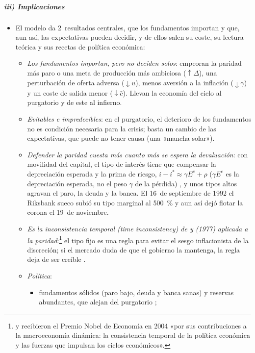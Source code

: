 \documentclass[11pt]{article}
\begin{document}
\subparagraph{iii) Implicaciones}

\begin{itemize}
\item El modelo da 2~resultados centrales, que los fundamentos importan y que, aun así, las expectativas pueden decidir, y de ellos salen su coste, su lectura teórica y sus recetas de política económica:
  \begin{itemize}
  \item \emph{Los fundamentos importan, pero no deciden solos}: empeoran la paridad más paro o una meta de producción más ambiciosa ($\uparrow\Delta$), una perturbación de oferta adversa ($\downarrow u$), menos aversión a la inflación ($\downarrow\gamma$) y un coste de salida menor ($\downarrow\bar c$). Llevan la economía del cielo al purgatorio y de este al infierno.
  \item \emph{Evitables e impredecibles}: en el purgatorio, el deterioro de los fundamentos no es condición necesaria para la crisis; basta un cambio de las expectativas, que puede no tener causa (una «mancha solar»).
  \item \emph{Defender la paridad cuesta más cuanto más se espera la devaluación}: con movilidad del capital, el tipo de interés tiene que compensar la depreciación esperada y la prima de riesgo, $i-i^{*}\approx\gamma E^e+\rho$ ($\gamma E^e$ es la depreciación esperada, no el peso $\gamma$ de la pérdida) , y unos tipos altos agravan el paro, la deuda y la banca. El 16~de septiembre de 1992 el Riksbank sueco subió su tipo marginal al 500~\% y aun así dejó flotar la corona el 19~de noviembre\nocite{Riksbank2026Ranta500}.
  \item \emph{Es la inconsistencia temporal (\emph{time inconsistency}) de  y  (1977) aplicada a la paridad}:\footnote{ y  recibieron el Premio Nobel de Economía en 2004 «por sus contribuciones a la macroeconomía dinámica: la consistencia temporal de la política económica y las fuerzas que impulsan los ciclos económicos»\nocite{Nobel2004KydlandPrescott}.} el tipo fijo es una regla para evitar el sesgo inflacionista de la discreción; si el mercado duda de que el gobierno la mantenga, la regla deja de ser creíble\nocite{KydlandPrescott1977Rules,BarroGordon1983Positive} .
  \item \emph{Política}:
    \begin{itemize}
    \item fundamentos sólidos (paro bajo, deuda y banca sanas) y reservas abundantes, que alejan del purgatorio ;

\end{itemize}
\end{itemize}
\end{itemize}
\end{document}
